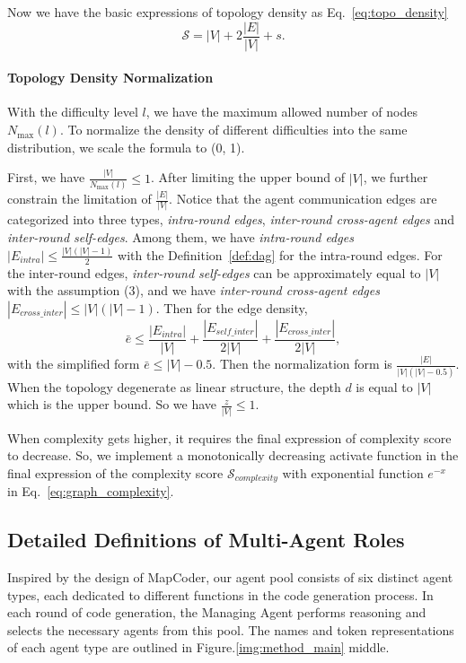 \documentclass{article}
\theoremstyle{definition}
\begin{document}
Now we have the basic expressions of topology density as Eq.~\ref{eq:topo_density}
\begin{equation}\label{eq:topo_density}
\mathcal{S} = |V| + 2\frac{|E|}{|V|} + s.
\end{equation}
\paragraph{Topology Density Normalization} 
With the difficulty level $l$, we have the maximum allowed number of nodes $N_{\max}(l)$. To normalize the density of different difficulties into the same distribution, we scale the formula to (0, 1). 

First, we have $\frac{|V|}{N_{\max}(l)} \leq 1$. After limiting the upper bound of $|V|$, we further constrain the limitation of $\frac{|E|}{|V|}$. Notice that the agent communication edges are categorized into three types, \emph{intra-round edges}, \emph{inter-round cross-agent edges} and \emph{inter-round self-edges}. Among them, we have \emph{intra-round edges} $|E_{intra}| \leq \frac{|V|(|V|-1)}{2}$ with the Definition~\ref{def:dag} for the intra-round edges. For the inter-round edges, \emph{inter-round self-edges} can be approximately equal to $|V|$ with the assumption (3), and we have \emph{inter-round cross-agent edges} $|E_{cross\_inter}|\leq |V|(|V|-1)$. Then for the edge density, 
\begin{equation}\label{eq:edge_density1}
\bar{e} \leq \frac{|E_{intra}|}{|V|} + \frac{|E_{self\_inter}|}{2|V|}+\frac{|E_{cross\_inter}|}{2|V|},
\end{equation}
with the simplified form $\bar{e} \leq |V|-0.5$. Then the normalization form is $\frac{|E|}{|V|(|V|-0.5)}$. When the topology degenerate as linear structure, the depth $d$ is equal to $|V|$ which is the upper bound. So we have $\frac{z}{|V|} \leq 1$.

When complexity gets higher, it requires the final expression of complexity score to decrease. So, we implement a monotonically decreasing activate function in the final expression of the complexity score $\mathcal{S}_{complexity}$ with exponential function $e^{-x}$ in Eq.~\ref{eq:graph_complexity}.
\subsection{Detailed Definitions of Multi-Agent Roles}
Inspired by the design of MapCoder, our agent pool consists of six distinct agent types, each dedicated to different functions in the code generation process. In each round of code generation, the Managing Agent performs reasoning and selects the necessary agents from this pool. The names and token representations of each agent type are outlined in Figure.\ref{img:method_main} middle.
\end{document}
